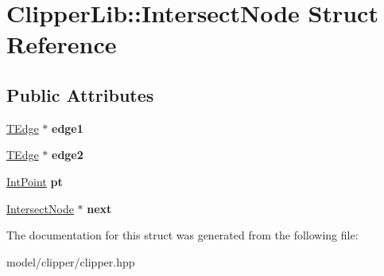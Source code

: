 \hypertarget{structClipperLib_1_1IntersectNode}{\section{Clipper\-Lib\-:\-:Intersect\-Node Struct Reference}
\label{structClipperLib_1_1IntersectNode}
}
\subsection*{Public Attributes}
\begin{DoxyCompactItemize}
\item 
\hypertarget{structClipperLib_1_1IntersectNode_a9ca23b5341d4609ecb24ad7ac5eb6da4}{\hyperlink{structClipperLib_1_1TEdge}{T\-Edge} $\ast$ {\bfseries edge1}}\label{structClipperLib_1_1IntersectNode_a9ca23b5341d4609ecb24ad7ac5eb6da4}

\item 
\hypertarget{structClipperLib_1_1IntersectNode_ac32451de72e8e929bbb9704b8d330317}{\hyperlink{structClipperLib_1_1TEdge}{T\-Edge} $\ast$ {\bfseries edge2}}\label{structClipperLib_1_1IntersectNode_ac32451de72e8e929bbb9704b8d330317}

\item 
\hypertarget{structClipperLib_1_1IntersectNode_af24af801ac1e74f9200908dcad88cc30}{\hyperlink{structClipperLib_1_1IntPoint}{Int\-Point} {\bfseries pt}}\label{structClipperLib_1_1IntersectNode_af24af801ac1e74f9200908dcad88cc30}

\item 
\hypertarget{structClipperLib_1_1IntersectNode_a6534367f8cc07404d5f19230166f8c78}{\hyperlink{structClipperLib_1_1IntersectNode}{Intersect\-Node} $\ast$ {\bfseries next}}\label{structClipperLib_1_1IntersectNode_a6534367f8cc07404d5f19230166f8c78}

\end{DoxyCompactItemize}


The documentation for this struct was generated from the following file\-:\begin{DoxyCompactItemize}
\item 
model/clipper/clipper.\-hpp\end{DoxyCompactItemize}
